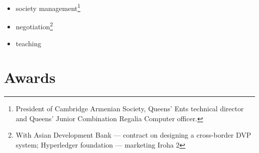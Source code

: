 \documentclass{CurriculumVitae}[10pt, condensed]
\begin{document}
\begin{multicols}{4}
\begin{itemize}[topsep=0pt]
\begin{itemize}[topsep=0pt, partopsep=0pt]
      \setlength{\itemsep}{-0.3em}
    \item society management\footnote{President of Cambridge Armenian
        Society, Queens' Ents technical director and Queens' Junior
        Combination Regalia Computer officer. }
    \item negotiation\footnote{With Asian Development Bank ---
        contract on designing a cross-border DVP system; Hyperledger
        foundation ---  marketing Iroha 2}
    \item teaching
    \end{itemize}
  \end{itemize}

\end{multicols}




\section*{Awards}







\end{document}
